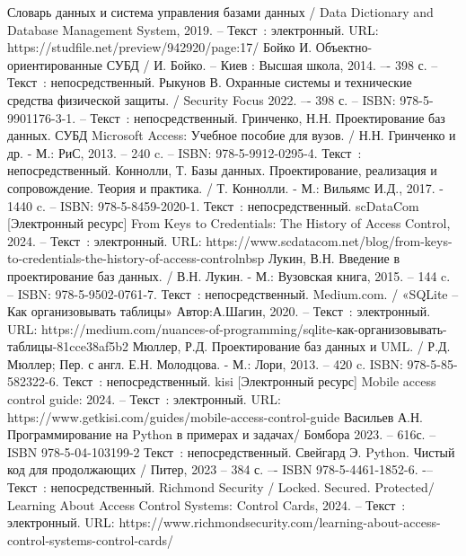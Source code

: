 
\begin{thebibliography}{9}
	
	Словарь данных и система управления базами данных / Data Dictionary and Database Management System, 2019. – Текст~: электронный. URL: https://studfile.net/preview/942920/page:17/
	Бойко И. Объектно-ориентированные СУБД / И. Бойко. – Киев : Высшая школа, 2014. –- 398 с. -- Текст~: непосредственный.  
	Рыкунов В. Охранные системы и технические средства физической защиты.  /  Security Focus 2022. –- 398 с. – ISBN: 978-5-9901176-3-1. – Текст~: непосредственный.   
	Гринченко, Н.Н. Проектирование баз данных. СУБД Microsoft Access: Учебное пособие для вузов. / Н.Н. Гринченко и др. - М.: РиС, 2013. -- 240 c. -- ISBN: 978-5-9912-0295-4.  Текст~: непосредственный.
	Коннолли, Т. Базы данных. Проектирование, реализация и сопровождение. Теория и практика. / Т. Коннолли. - М.: Вильямс И.Д., 2017. - 1440 c. -- ISBN:  978-5-8459-2020-1. Текст~: непосредственный.
	scDataCom [Электронный ресурс] From Keys to Credentials: The History of Access Control, 2024. – Текст~: электронный. URL: https://www.scdatacom.net/blog/from-keys-to-credentials-the-history-of-access-controlnbsp
	Лукин, В.Н. Введение в проектирование баз данных. / В.Н. Лукин. - М.: Вузовская книга, 2015. -- 144 c. -- ISBN: 978-5-9502-0761-7. Текст~: непосредственный.	
	Medium.com. / «SQLite – Как организовывать таблицы» Автор:А.Шагин, 2020. – Текст~: электронный. URL: https://medium.com/nuances-of-programming/sqlite-как-организовывать-таблицы-81cce38af5b2
	Мюллер, Р.Д. Проектирование баз данных и UML. / Р.Д. Мюллер; Пер. с англ. Е.Н. Молодцова. - М.: Лори, 2013. -- 420 c. ISBN: 978-5-85-582322-6. Текст~: непосредственный.
	kisi [Электронный ресурс] Mobile access control guide: 2024.  – Текст~: электронный. URL: https://www.getkisi.com/guides/mobile-access-control-guide
	 Васильев А.Н. Программирование на Python в примерах и задачах/ Бомбора 2023. -- 616с. --ISBN 978-5-04-103199-2 Текст~: непосредственный.    	
	Свейгард Э. Python. Чистый код для продолжающих / Питер, 2023 – 384 с. –- ISBN 978-5-4461-1852-6. -– Текст~: непосредственный.    
	Richmond Security / Locked. Secured. Protected/ Learning About Access Control Systems: Control Cards, 2024.  – Текст~: электронный. URL: https://www.richmondsecurity.com/learning-about-access-control-systems-control-cards/

\end{thebibliography}
